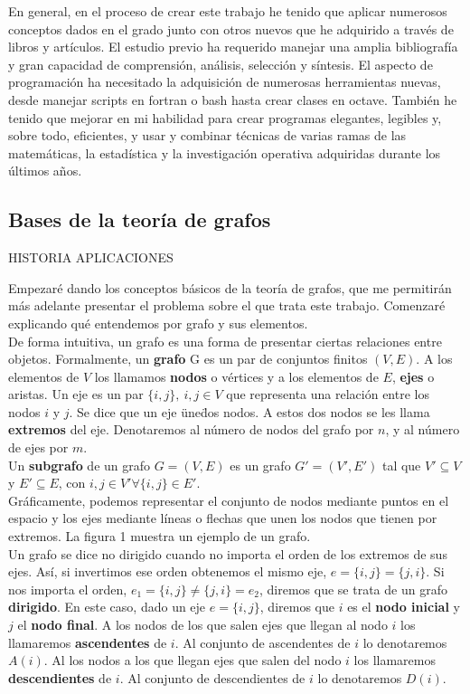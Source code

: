 En general, en el proceso de crear este trabajo he tenido que aplicar numerosos conceptos dados en el grado junto con otros nuevos que he adquirido a través de libros y artículos.
El estudio previo ha requerido manejar una amplia bibliografía y gran capacidad de comprensión, análisis, selección y síntesis.
El aspecto de programación ha necesitado la adquisición de numerosas herramientas nuevas, desde manejar scripts en fortran o bash hasta crear clases en octave.
También he tenido que mejorar en mi habilidad para crear programas elegantes, legibles y, sobre todo, eficientes, y usar y combinar técnicas de varias ramas de las matemáticas, la estadística y la investigación operativa adquiridas durante los últimos años.

\subsection{Bases de la teoría de grafos}
\label{subsec:1.1}
HISTORIA
APLICACIONES

Empezaré dando los conceptos básicos de la teoría de grafos, que me permitirán más adelante presentar el problema sobre el que trata este trabajo.
Comenzaré explicando qué entendemos por grafo y sus elementos.\\

De forma intuitiva, un grafo es una forma de presentar ciertas relaciones entre objetos.
Formalmente, un \textbf{grafo} G es un par de conjuntos finitos $(V, E)$.
A los elementos de $V$ los llamamos \textbf{nodos} o vértices y a los elementos de $E$, \textbf{ejes} o aristas.
Un eje es un par $\{i, j\},\ i, j \in V$ que representa una relación entre los nodos $i$ y $j$.
Se dice que un eje \"une\" dos nodos.
A estos dos nodos se les llama \textbf{extremos} del eje.
Denotaremos al número de nodos del grafo por $n$, y al número de ejes por $m$.\\

Un \textbf{subgrafo} de un grafo $G = (V, E)$ es un grafo $G' = (V', E')$ tal que $V' \subseteq V$ y $E' \subseteq E$, con $i, j \in V' \forall \{i, j\} \in E'$.\\

Gráficamente, podemos representar el conjunto de nodos mediante puntos en el espacio y los ejes mediante líneas o flechas que unen los nodos que tienen por extremos.
La figura 1 muestra un ejemplo de un grafo.\\

Un grafo se dice no dirigido cuando no importa el orden de los extremos de sus ejes.
Así, si invertimos ese orden obtenemos el mismo eje, $e = \{i, j\} = \{j, i\}$.
Si nos importa el orden, $e_1 = \{i, j\} \neq \{j, i\} = e_2$, diremos que se trata de un grafo \textbf{dirigido}.
En este caso, dado un eje $e = \{i, j\}$, diremos que $i$ es el \textbf{nodo inicial} y $j$ el \textbf{nodo final}.
A los nodos de los que salen ejes que llegan al nodo $i$ los llamaremos \textbf{ascendentes} de $i$. Al conjunto de ascendentes de $i$ lo denotaremos $A(i)$.
Al los nodos a los que llegan ejes que salen del nodo $i$ los llamaremos \textbf{descendientes} de $i$. Al conjunto de descendientes de $i$ lo denotaremos $D(i)$.\\

